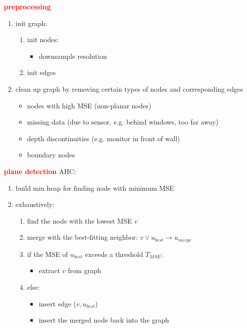 \documentclass[main.tex]{subfiles}
\begin{document}
\textbf{\textcolor{red}{preprocessing}}
\begin{enumerate}
    \item init graph:
          \begin{enumerate}
              \item init nodes:
                    \begin{itemize}
                        \item downsample resolution
                    \end{itemize}
              \item init edges
          \end{enumerate}
    \item clean up graph by removing certain types of nodes and corresponding edges
          \begin{itemize}
              \item nodes with high MSE (non-planar nodes)
              \item missing data (due to sensor, e.g. behind windows, too far away)
              \item depth discontinuities (e.g. monitor in front of wall)
              \item boundary nodes
          \end{itemize}
\end{enumerate}
\textbf{\textcolor{red}{plane detection}}
AHC:
\begin{enumerate}
    \item build min heap for finding node with minimum MSE
    \item exhaustively:
          \begin{enumerate}
              \item find the node with the lowest MSE $v$
              \item merge with the best-fitting neighbor: $v \lor u_{best} \rightarrow u_{merge}$
              \item if the MSE of $u_{best}$ exceeds a threshold $T_{MSE}$:
                    \begin{itemize}
                        \item extract $v$ from graph
                    \end{itemize}
              \item else:
                    \begin{itemize}
                        \item insert edge ($v,u_{best}$)
                        \item insert the merged node back into the graph
                    \end{itemize}
          \end{enumerate}
\end{enumerate}
\end{document}
